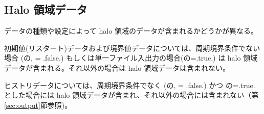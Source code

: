 \subsection{Halo 領域データ}
データの種類や設定によって halo 領域のデータが含まれるかどうかが異なる。

初期値(リスタート)データおよび境界値データについては、周期境界条件でない場合 (の,  = .false.) もしくは単一ファイル入出力の場合(の=.true.) は halo 領域データが含まれる。それ以外の場合は halo 領域データは含まれない。

ヒストリデータについては、周期境界条件でなく (の,  = .false.) かつ の=.true. とした場合には halo 領域データが含まれ、それ以外の場合には含まれない（第\ref{sec:output}節参照)。



